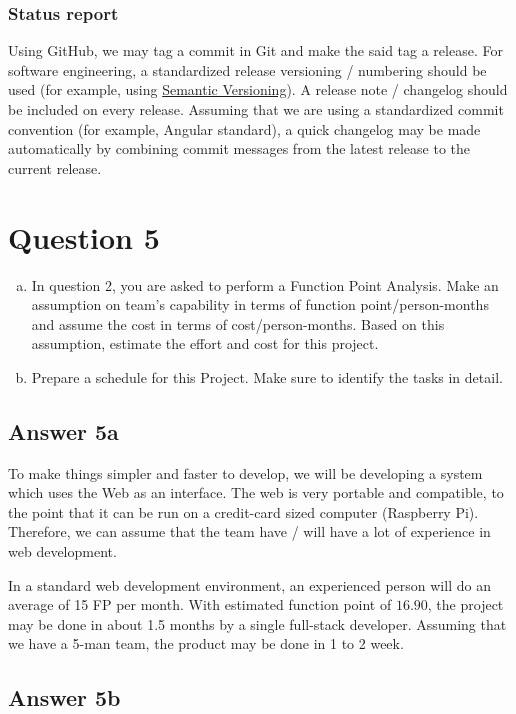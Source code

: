 \documentclass[
  11pt, %
]{assignment}
\begin{document}
\subsubsection*{Status report}

Using GitHub, we may tag a commit in Git and make the said tag a release. For software engineering, a standardized release versioning / numbering should be used (for example, using \href{https://semver.org}{Semantic Versioning}). A release note / changelog should be included on every release. Assuming that we are using a standardized commit convention (for example, Angular standard), a quick changelog may be made automatically by combining commit messages from the latest release to the current release.

\section*{Question 5}
\begin{problem}
\begin{enumerate}[a.]
  \item In question 2, you are asked to perform a Function Point Analysis. Make an assumption on team's capability in terms of function point/person-months and assume the cost in terms of cost/person-months. Based on this assumption, estimate the effort and cost for this project.
  \item Prepare a schedule for this Project. Make sure to identify the tasks in detail.
\end{enumerate}
\end{problem}

\subsection*{Answer 5a}
To make things simpler and faster to develop, we will be developing a system which uses the Web as an interface. The web is very portable and compatible, to the point that it can be run on a credit-card sized computer (Raspberry Pi). Therefore, we can assume that the team have / will have a lot of experience in web development.

In a standard web development environment, an experienced person will do an average of 15 FP per month. With estimated function point of \(16.90\), the project may be done in about 1.5 months by a single full-stack developer. Assuming that we have a 5-man team, the product may be done in 1 to 2 week.

\subsection*{Answer 5b}
\end{document}
